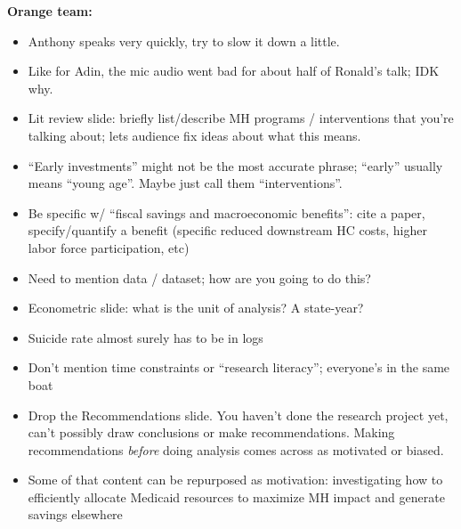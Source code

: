\documentclass[12pt,pdftex,letterpaper]{article}
\begin{document}
\vspace{0.5cm}

\noindent \textbf{Orange team:}
\begin{itemize}
	\item Anthony speaks very quickly, try to slow it down a little.
	
	\item Like for Adin, the mic audio went bad for about half of Ronald's talk; IDK why.
	
	\item Lit review slide: briefly list/describe MH programs / interventions that you're talking about; lets audience fix ideas about what this means.
	
	\item ``Early investments'' might not be the most accurate phrase; ``early'' usually means ``young age''. Maybe just call them ``interventions''.
	
	\item Be specific w/ ``fiscal savings and macroeconomic benefits'': cite a paper, specify/quantify a benefit (specific reduced downstream HC costs, higher labor force participation, etc)
	
	\item Need to mention data / dataset; how are you going to do this?
	
	\item Econometric slide: what is the unit of analysis? A state-year?
	
	\item Suicide rate almost surely has to be in logs
	
	\item Don't mention time constraints or ``research literacy''; everyone's in the same boat
	
	\item Drop the Recommendations slide. You haven't done the research project yet, can't possibly draw conclusions or make recommendations. Making recommendations \textit{before} doing analysis comes across as motivated or biased.
	
	\item Some of that content can be repurposed as motivation: investigating how to efficiently allocate Medicaid resources to maximize MH impact and generate savings elsewhere
\end{itemize}
\end{document}
